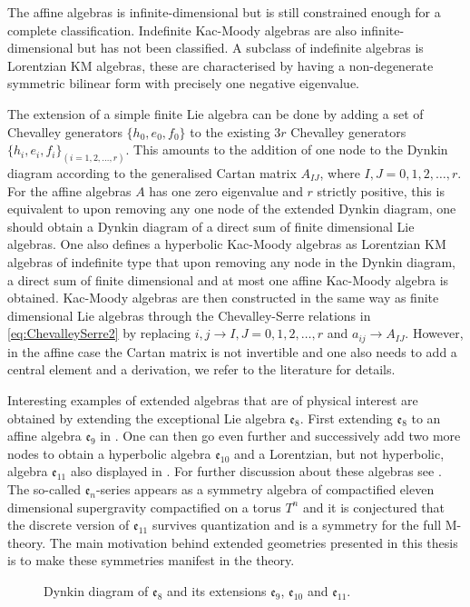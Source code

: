 The affine algebras is infinite-dimensional but is still constrained enough for a complete classification. Indefinite Kac-Moody algebras are also infinite-dimensional but has not been classified. A subclass of indefinite algebras is Lorentzian KM algebras, these are characterised by having a non-degenerate symmetric bilinear form with precisely one negative eigenvalue. 

The extension of a simple finite Lie algebra can be done by adding a set of Chevalley generators $\{h_0,e_0,f_0\}$ to the existing $3r$ Chevalley generators $\{h_i,e_i,f_i\}_{(i=1,2,\ldots,r)}$. This amounts to the addition of one node to the Dynkin diagram according to the generalised Cartan matrix $A_{IJ}$, where $I,J=0,1,2,\ldots, r$. For the affine algebras $A$ has one zero eigenvalue and $r$ strictly positive, this is equivalent to upon removing any one node of the extended Dynkin diagram, one should obtain a Dynkin diagram of a direct sum of finite dimensional Lie algebras. One also defines a hyperbolic Kac-Moody algebras as Lorentzian KM algebras of indefinite type that upon removing any node in the Dynkin diagram, a direct sum of finite dimensional and at most one affine Kac-Moody algebra is obtained. Kac-Moody algebras are then constructed in the same way as finite dimensional Lie algebras through the Chevalley-Serre relations in \eqref{eq:ChevalleySerre2} by replacing $i,j\to I,J=0,1,2,\ldots,r$ and $a_{ij}\to A_{IJ}$. However, in the affine case the Cartan matrix is not invertible and one also needs to add a central element and a derivation, we refer to the literature for details. 

Interesting examples of extended algebras that are of physical interest are obtained by extending the exceptional Lie algebra $\mathfrak{e}_8$. First extending $\mathfrak{e}_8$ to an affine algebra $\mathfrak{e}_9$ in . One can then go even further and successively add two more nodes to obtain a hyperbolic algebra $\mathfrak{e}_{10}$ and a Lorentzian, but not hyperbolic, algebra $\mathfrak{e}_{11}$ also displayed in . For further discussion about these algebras see \cite{PhdJakob2009,PhdDaniel2010}. The so-called $\mathfrak{e}_n$-series appears as a symmetry algebra of compactified eleven dimensional supergravity compactified on a torus $T^n$ and it is conjectured \cite{West2011} that the discrete version of $\mathfrak{e}_{11}$ survives quantization and is a symmetry for the full M-theory. The main motivation behind extended geometries presented in this thesis is to make these symmetries manifest in the theory. 
\begin{figure}
    \caption{Dynkin diagram of $\mathfrak{e}_8$ and its extensions $\mathfrak{e}_9$, $\mathfrak{e}_{10}$ and $\mathfrak{e}_{11}$.}
    \label{fig:DynkinEseries}
\end{figure}

